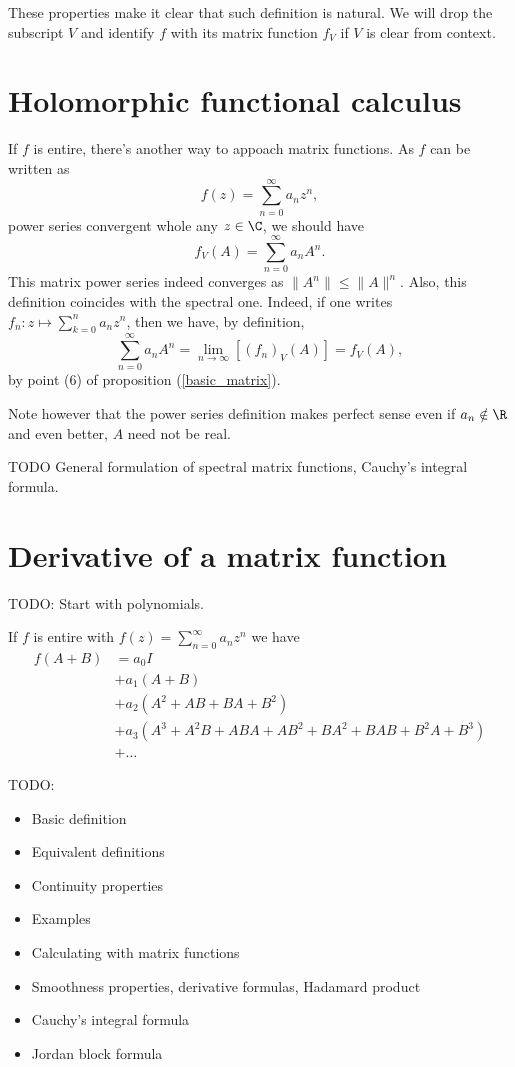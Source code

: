 These properties make it clear that such definition is natural. We will drop the subscript $V$ and identify $f$ with its matrix function $f_{V}$ if $V$ is clear from context.

\section{Holomorphic functional calculus}

If $f$ is entire, there's another way to appoach matrix functions. As $f$ can be written as
\[
	f(z) = \sum_{n = 0}^{\infty} a_{n} z^{n},
\]
power series convergent whole any $z \in \C$, we should have
\[
	f_{V}(A) = \sum_{n = 0}^{\infty} a_{n} A^{n}.
\]
This matrix power series indeed converges as $\|A^{n}\| \leq \|A\|^{n}$. Also, this definition coincides with the spectral one. Indeed, if one writes $f_{n} : z \mapsto  \sum_{k = 0}^{n} a_{n} z^{n}$, then we have, by definition,
\[
	\sum_{n = 0}^{\infty}a_{n} A^{n} = \lim_{n \to \infty} \left[(f_{n})_{V}(A) \right] = f_{V}(A),
\]
by point (6) of proposition (\ref{basic_matrix}).

Note however that the power series definition makes perfect sense even if $a_{n} \notin \R$ and even better, $A$ need not be real.

TODO General formulation of spectral matrix functions, Cauchy's integral formula.

\section{Derivative of a matrix function}

TODO: Start with polynomials.

If $f$ is entire with $f(z) = \sum_{n = 0}^{\infty} a_{n} z^{n}$ we have
\begin{align*}
	f(A + B) &= a_{0} I \\
			&+ a_{1} (A + B) \\
			&+ a_{2} (A^2 + AB + BA + B^2) \\
			&+ a_{3} (A^3 + A^2 B + ABA + AB^2 + BA^2 + BAB + B^2A + B^3) \\
			&+ \ldots
\end{align*}

TODO:
\begin{itemize}
	\item Basic definition
	\item Equivalent definitions
	\item Continuity properties
	\item Examples
	\item Calculating with matrix functions
	\item Smoothness properties, derivative formulas, Hadamard product
	\item Cauchy's integral formula
	\item Jordan block formula
\end{itemize}
